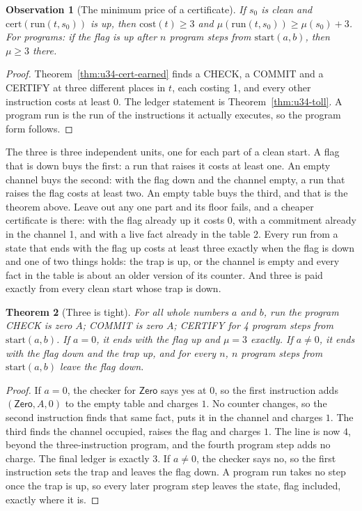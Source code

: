 \documentclass[11pt,twoside]{article}
\theoremstyle{thielethm}
\newtheorem{theorem}{Theorem}[section]
\theoremstyle{thieledef}
\theoremstyle{thieledef}
\theoremstyle{thieledef}
\theoremstyle{thielethm}
\theoremstyle{thieleobs}
\newtheorem{observation}[theorem]{Observation}
\theoremstyle{thielethm}
\begin{document}
\begin{observation}[The minimum price of a certificate]\label{thm:u34-min-price}
If $s_0$ is clean and $\mathrm{cert}(\mathrm{run}(t, s_0))$ is up, then $\mathrm{cost}(t)
\ge 3$ and $\mu(\mathrm{run}(t, s_0)) \ge \mu(s_0) + 3$. For programs: if the flag is up
after $n$ program steps from $\mathrm{start}(a, b)$, then $\mu \ge 3$ there.
\end{observation}

\begin{proof}
Theorem~\ref{thm:u34-cert-earned} finds a CHECK, a COMMIT and a CERTIFY at three different
places in $t$, each costing 1, and every other instruction costs at least 0. The ledger
statement is Theorem~\ref{thm:u34-toll}. A program run is the run of the instructions it
actually executes, so the program form follows.
\end{proof}

The three is three independent units, one for each part of a clean start. A flag that is down
buys the first: a run that raises it costs at least one. An empty channel buys
the second: with the flag down and the channel empty, a run that raises the flag costs at least two. An empty table buys the third, and that is the theorem above. Leave out
any one part and its floor fails, and a cheaper certificate is there: with the flag already up it
costs 0, with a commitment already in the channel 1, and with a live fact already in the table 2.
Every run from a state that ends with the flag up costs at
least three exactly when the flag is down and one of two things holds: the trap is up,
or the channel is empty and
every fact in the table is about an older version of its counter. And three is paid exactly from
every clean start whose trap is down.

\begin{theorem}[Three is tight]\label{thm:u34-tight}
For all whole numbers $a$ and $b$, run the program CHECK \emph{is zero} $A$; COMMIT \emph{is zero}
$A$; CERTIFY for 4 program steps from $\mathrm{start}(a, b)$. If $a = 0$, it ends with the
flag up and $\mu = 3$ exactly. If $a \ne 0$, it ends with the flag down and the trap up, and
for every $n$, $n$ program steps from $\mathrm{start}(a, b)$ leave the flag down.
\end{theorem}

\begin{proof}
If $a = 0$, the checker for $\mathsf{Zero}$ says yes at $0$, so the first instruction adds
$(\mathsf{Zero},A,0)$ to the empty table and charges $1$. No counter changes, so the
second instruction finds that same fact, puts it in the channel and charges $1$. The
third finds the channel occupied, raises the flag and charges $1$. The line is now $4$,
beyond the three-instruction program, and the fourth program step adds no charge. The
final ledger is exactly $3$. If $a \ne 0$, the checker says no, so the first instruction
sets the trap and leaves the flag down. A program run takes no step once the trap is up,
so every later program step leaves the state, flag included, exactly where it is.
\end{proof}
\end{document}
